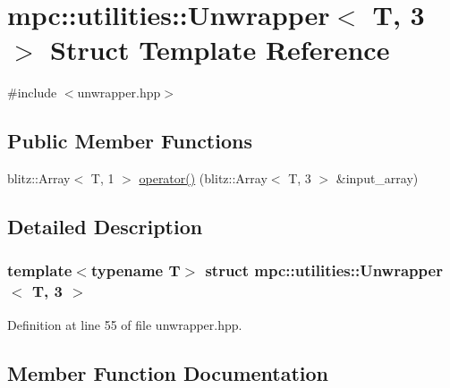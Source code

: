 \hypertarget{structmpc_1_1utilities_1_1_unwrapper_3_01_t_00_013_01_4}{}\section{mpc\+:\+:utilities\+:\+:Unwrapper$<$ T, 3 $>$ Struct Template Reference}
\label{structmpc_1_1utilities_1_1_unwrapper_3_01_t_00_013_01_4}


{\ttfamily \#include $<$unwrapper.\+hpp$>$}

\subsection*{Public Member Functions}
\begin{DoxyCompactItemize}
\item 
blitz\+::\+Array$<$ T, 1 $>$ \mbox{\hyperlink{structmpc_1_1utilities_1_1_unwrapper_3_01_t_00_013_01_4_a584381b7b967c8245578bfaaf9ca1a0f}{operator()}} (blitz\+::\+Array$<$ T, 3 $>$ \&input\+\_\+array)
\end{DoxyCompactItemize}


\subsection{Detailed Description}
\subsubsection*{template$<$typename T$>$\newline
struct mpc\+::utilities\+::\+Unwrapper$<$ T, 3 $>$}



Definition at line 55 of file unwrapper.\+hpp.



\subsection{Member Function Documentation}
\mbox{\label{structmpc_1_1utilities_1_1_unwrapper_3_01_t_00_013_01_4_a584381b7b967c8245578bfaaf9ca1a0f}} 

